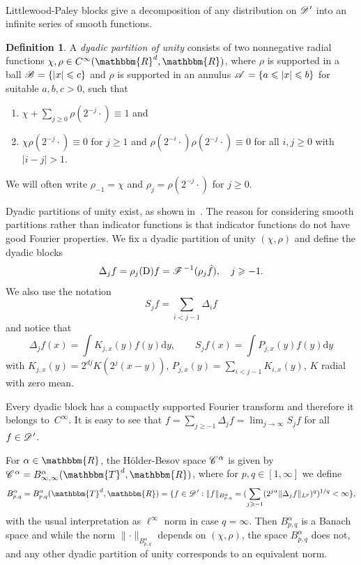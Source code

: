 \documentclass{amsart}
\newcommand{\cdummy}{\cdot}
\newcommand{\mathD}{\mathrm{D}}
\newcommand{\mathd}{\mathrm{d}}
\newcommand{\nosymbol}{}
\newcommand{\tmtextit}[1]{{\itshape{#1}}}
\theoremstyle{remark}
\theoremstyle{definition}
\newtheorem{definition}[theorem]{Definition}
\newcommand{\CC}{\mathscr{C} \hspace{.1em}}
\newcommand{\CD}{\mathscr{D} \hspace{.1em}}
\newcommand{\CF}{\mathscr{F} \hspace{.1em}}
\newcommand{\CB}{\mathscr{B} \hspace{.1em}}
\newcommand{\CA}{\mathscr{A} \hspace{.1em}}
\newcommand{\DD}{\mathscr{D} \hspace{.1em}}
\begin{document}
\

Littlewood-Paley blocks give a decomposition of any distribution on $\CD'$
into an infinite series of smooth functions.

\begin{definition}
  A \tmtextit{dyadic partition of unity} consists of two nonnegative radial
  functions $\chi, \rho \in C^{\infty} (\mathbbm{R}^d, \mathbbm{R})$, where
  $\rho$ is supported in a ball $\CB = \{ | x | \leqslant c \}$ and $\rho$ is
  supported in an annulus $\CA = \{ a \leqslant | x | \leqslant b \}$ for
  suitable $a, b, c > 0$, such that
  \begin{enumerate}
    \item $\chi + \sum_{j \geqslant 0} \rho (2^{- j} \cdummy) \equiv 1$ and
    
    \item \label{property-2-dyadic}$\chi \rho (2^{- j} \cdummy) \equiv 0$ for
    $j \geqslant 1$ and $\rho (2^{- i} \cdummy) \rho (2^{- j} \nosymbol
    \cdummy) \equiv 0$ for all $i, j \geqslant 0$ with $| i - j | > 1$.
  \end{enumerate}
  We will often write $\rho_{- 1} = \chi$ and $\rho_j = \rho (2^{- j}
  \cdummy)$ for $j \geqslant 0$.
\end{definition}

Dyadic partitions of unity exist, as shown in~{\cite{bahouri_fourier_2011}}.
The reason for considering smooth partitions rather than indicator functions
is that indicator functions do not have good Fourier properties. We fix a
dyadic partition of unity $(\chi, \rho)$ and define the dyadic blocks
\[ \Delta_j f = \rho_j (\mathD) f = \CF^{- 1} (\rho_j \hat{f}), \quad j
   \geqslant - 1. \]
We also use the notation
\[ S_j f = \sum_{i < j - 1} \Delta_i f \]
and notice that
\[ \Delta_j f (x) = \int K_{j, x} (y) f (y) \mathd y, \qquad S_j f (x) = \int
   P_{j, x} (y) f (y) \mathd y \]
with $K_{j, x} (y) = 2^{dj} K (2^j (x - y))$, $P_{j, x} (y) = \sum_{i < j - 1}
K_{i, x} (y)$, $K$ radial with zero mean.

Every dyadic block has a compactly supported Fourier transform and therefore
it belongs to~$C^{\infty}$. It is easy to see that $f = \sum_{j \geqslant - 1}
\Delta_j f = \lim_{j \rightarrow \infty} S_j f$ for all $f \in \CD'$.

For $\alpha \in \mathbbm{R}$, the H{\"o}lder-Besov space $\CC^{\alpha}$ is
given by $\CC^{\alpha} = B^{\alpha}_{\infty, \infty} (\mathbbm{T}^d,
\mathbbm{R})$, where for $p, q \in [1, \infty]$ we define
\[ B^{\alpha}_{p, q} = B^{\alpha}_{p, q} (\mathbbm{T}^d, \mathbbm{R}) = \{f
   \in \DD' : \|f\|_{B^{\alpha}_{p, q}} = (\sum_{j \geqslant - 1} (2^{j
   \alpha} \| \Delta_j f\|_{L^p})^q)^{1 / q} < \infty\}, \]
with the usual interpretation as $\ell^{\infty}$ norm in case $q = \infty$.
Then $B^{\alpha}_{p, q}$ is a Banach space and while the norm $\lVert \cdummy
\rVert_{B^{\alpha}_{p, q}}$ depends on $(\chi, \rho)$, the space
$B^{\alpha}_{p, q}$ does not, and any other dyadic partition of unity
corresponds to an equivalent norm.
\end{document}
